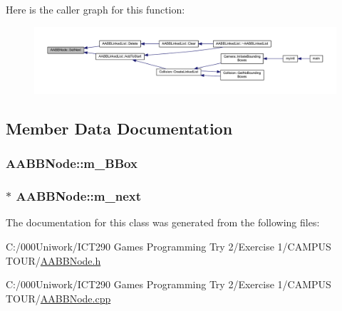 Here is the caller graph for this function\+:
\nopagebreak
\begin{figure}[H]
\begin{center}
\leavevmode
\includegraphics[width=350pt]{class_a_a_b_b_node_a2d624ad9c1241156af7a4dd96cbcd40f_icgraph}
\end{center}
\end{figure}




\subsection{Member Data Documentation}
\subsubsection[{\texorpdfstring{m\+\_\+\+B\+Box}{m_BBox}}]{ A\+A\+B\+B\+Node\+::m\+\_\+\+B\+Box\hspace{0.3cm}{\ttfamily [private]}}\hypertarget{class_a_a_b_b_node_ac45482982e70ba3d40c2099b99db0663}{}\label{class_a_a_b_b_node_ac45482982e70ba3d40c2099b99db0663}
\subsubsection[{\texorpdfstring{m\+\_\+next}{m_next}}]{$\ast$ A\+A\+B\+B\+Node\+::m\+\_\+next\hspace{0.3cm}{\ttfamily [private]}}\hypertarget{class_a_a_b_b_node_a2fe0e4624db458571d0935f4b09ec415}{}\label{class_a_a_b_b_node_a2fe0e4624db458571d0935f4b09ec415}


The documentation for this class was generated from the following files\+:\begin{DoxyCompactItemize}
\item 
C\+:/000\+Uniwork/\+I\+C\+T290 Games Programming Try 2/\+Exercise 1/\+C\+A\+M\+P\+U\+S T\+O\+U\+R/\hyperlink{_a_a_b_b_node_8h}{A\+A\+B\+B\+Node.\+h}\item 
C\+:/000\+Uniwork/\+I\+C\+T290 Games Programming Try 2/\+Exercise 1/\+C\+A\+M\+P\+U\+S T\+O\+U\+R/\hyperlink{_a_a_b_b_node_8cpp}{A\+A\+B\+B\+Node.\+cpp}\end{DoxyCompactItemize}
